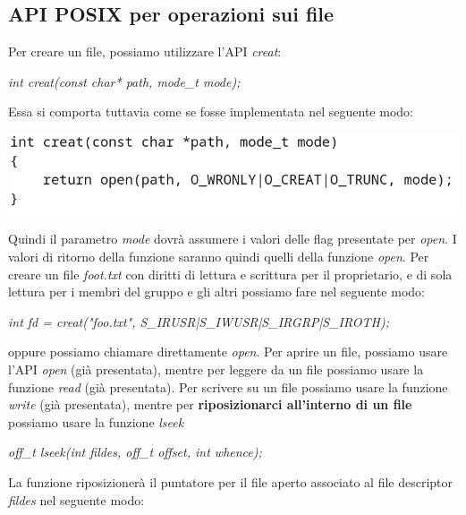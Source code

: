 \documentclass[12pt]{article}
\begin{document}
\subsection{API POSIX per operazioni sui file}
Per creare un file, possiamo utilizzare l'API \textit{creat}:
\begin{center}
    \textit{int creat(const char* path, mode\_t mode);}
\end{center}
Essa si comporta tuttavia come se fosse implementata nel seguente modo:
\begin{center}
    \includegraphics[width = 0.80\linewidth]{Images/32.png}
\end{center}
Quindi il parametro \textit{mode} dovrà assumere i valori delle flag presentate per \textit{open}. I valori
di ritorno della funzione saranno quindi quelli della funzione \textit{open}.
Per creare un file \textit{foot.txt} con diritti di lettura e scrittura per il proprietario, e di sola lettura per i membri
del gruppo e gli altri possiamo fare nel seguente modo:
\begin{center}
    \textit{int fd = creat("foo.txt", S\_IRUSR|S\_IWUSR|S\_IRGRP|S\_IROTH);}
\end{center}
oppure possiamo chiamare direttamente \textit{open}.
Per aprire un file, possiamo usare l'API \textit{open} (già presentata), mentre per leggere da un file
possiamo usare la funzione \textit{read} (già presentata).
Per scrivere su un file possiamo usare la funzione \textit{write} (già presentata), mentre per \textbf{riposizionarci all'interno di un file} possiamo usare
la funzione \textit{lseek}
\begin{center}
    \textit{off\_t lseek(int fildes, off\_t offset, int whence);}
\end{center}
La funzione riposizionerà il puntatore per il file aperto associato al file descriptor \textit{fildes} nel seguente modo:
\end{document}
